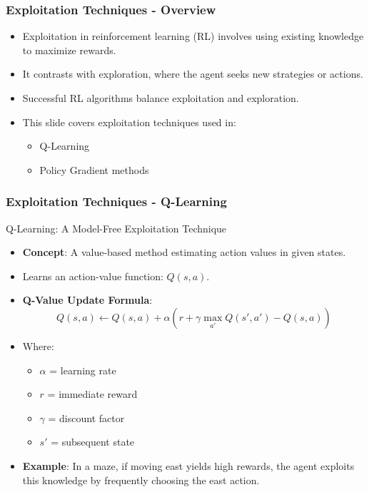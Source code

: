 \documentclass[aspectratio=169]{beamer}
\begin{document}
\begin{frame}[fragile]
    \frametitle{Exploitation Techniques - Overview}
    \begin{itemize}
        \item Exploitation in reinforcement learning (RL) involves using existing knowledge to maximize rewards.
        \item It contrasts with exploration, where the agent seeks new strategies or actions.
        \item Successful RL algorithms balance exploitation and exploration.
        \item This slide covers exploitation techniques used in:
        \begin{itemize}
            \item Q-Learning
            \item Policy Gradient methods
        \end{itemize}
    \end{itemize}
\end{frame}

\begin{frame}[fragile]
    \frametitle{Exploitation Techniques - Q-Learning}
    \begin{block}{Q-Learning: A Model-Free Exploitation Technique}
        \begin{itemize}
            \item \textbf{Concept}: A value-based method estimating action values in given states.
            \item Learns an action-value function: \( Q(s, a) \).
            \item \textbf{Q-Value Update Formula}:
            \begin{equation}
            Q(s, a) \leftarrow Q(s, a) + \alpha \left( r + \gamma \max_{a'} Q(s', a') - Q(s, a) \right)
            \end{equation}
            \item Where:
            \begin{itemize}
                \item \( \alpha \) = learning rate
                \item \( r \) = immediate reward
                \item \( \gamma \) = discount factor
                \item \( s' \) = subsequent state
            \end{itemize}
            \item \textbf{Example}: In a maze, if moving east yields high rewards, the agent exploits this knowledge by frequently choosing the east action.
        \end{itemize}
    \end{block}
\end{frame}
\end{document}
